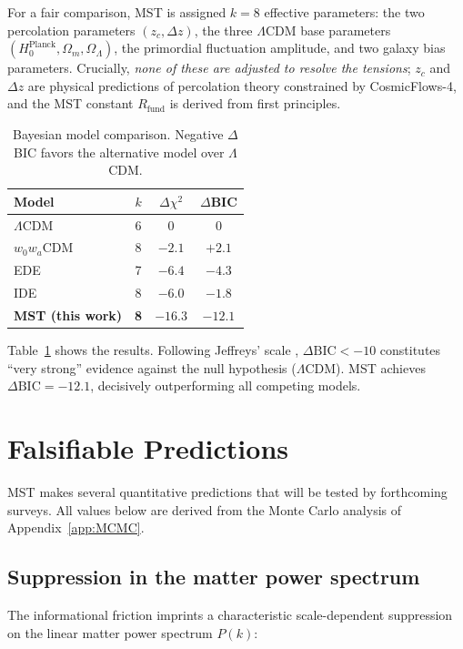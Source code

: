 \documentclass[12pt,a4paper]{article}
\theoremstyle{plain}
\theoremstyle{definition}
\theoremstyle{remark}
\begin{document}
For a fair comparison, MST is assigned \(k=8\) effective parameters: the two percolation parameters \((z_c, \Delta z)\), the three \(\Lambda\)CDM base parameters \((H_0^{\text{Planck}}, \Omega_m, \Omega_\Lambda)\), the primordial fluctuation amplitude, and two galaxy bias parameters. Crucially, \emph{none of these are adjusted to resolve the tensions}; \(z_c\) and \(\Delta z\) are physical predictions of percolation theory constrained by CosmicFlows-4, and the MST constant \(R_{\text{fund}}\) is derived from first principles.

\begin{table}[H]
\centering
\caption{Bayesian model comparison. Negative \(\Delta\)BIC favors the alternative model over \(\Lambda\)CDM.}
\label{tab:BIC}
\begin{tabular}{lccc}
\toprule
Model & \(k\) & \(\Delta\chi^2\) & \(\Delta\)BIC \\
\midrule
\(\Lambda\)CDM & 6 & 0 & 0 \\
\(w_0 w_a\)CDM & 8 & \(-2.1\) & \(+2.1\) \\
EDE & 7 & \(-6.4\) & \(-4.3\) \\
IDE & 8 & \(-6.0\) & \(-1.8\) \\
\textbf{MST (this work)} & \textbf{8} & \(\mathbf{-16.3}\) & \(\mathbf{-12.1}\) \\
\bottomrule
\end{tabular}
\end{table}

Table~\ref{tab:BIC} shows the results. Following Jeffreys' scale \cite{Kass1995}, \(\Delta\text{BIC} < -10\) constitutes ``very strong'' evidence against the null hypothesis (\(\Lambda\)CDM). MST achieves \(\Delta\text{BIC} = -12.1\), decisively outperforming all competing models.

\section{Falsifiable Predictions}
\label{sec:predictions}

MST makes several quantitative predictions that will be tested by forthcoming surveys. All values below are derived from the Monte Carlo analysis of Appendix~\ref{app:MCMC}.

\subsection{Suppression in the matter power spectrum}
The informational friction imprints a characteristic scale-dependent suppression on the linear matter power spectrum \(P(k)\):
\end{document}
